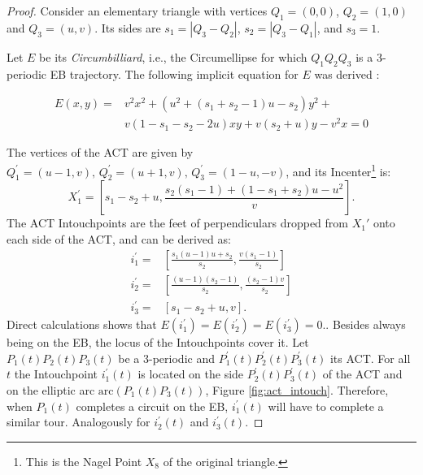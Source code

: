 \begin{proof}
Consider an elementary triangle with vertices $Q_1=(0,0)$, $Q_2=(1,0)$  and $Q_3=(u,v)$. Its sides are $s_1=|Q_3-Q_2|$, $s_2=|Q_3-Q_1|$, and $s_3=1$.

Let $E$ be its {\em Circumbilliard}, i.e., the Circumellipse for which ${Q_1}{Q_2}{Q_3}$ is a 3-periodic EB trajectory. The following implicit equation for $E$ was derived \cite{garcia2019-incenter}:

\begin{align*}
 E(x,y)=& v^2 x^2+(u^2+(s_1+s_2-1)u-s_2 )y^2+\\
 &v( 1-s_1-s_2-2u )x y+v(s_2+u)y-v^2x =0
\end{align*}

The vertices of the ACT are given by
 $Q_1^\prime=(u-1,v),\,Q_2^\prime=(u+1,v),\,Q_3^\prime=(1-u,-v)$, and its Incenter\footnote{This is the Nagel Point $X_8$ of the original triangle.} is:
 \begin{equation*}
 X_1^\prime=\left[s_1-s_2+u, \frac{s_2(s_1-1)+(1-s_1+s_2)u  -u^2}{v}
 \right].
 \end{equation*}
 The ACT Intouchpoints are the feet of perpendiculars dropped from $X_1'$ onto each side of the ACT, and can be derived as:
 \begin{align*}
 i_1^\prime=& \left[ \frac{s_1(u-1)u+s_2}{s_2},\frac{ v (s_1-1)}{s_2} \right]\\
  i_2^\prime=& \left[  \frac{ (u-1)(s_2-1)}{s_2}, \frac{(s_2-1)v}{s_2}   \right]\\
   i_3^\prime=& \left[   s_1-s_2+u,v \right].
\end{align*}
Direct calculations shows that
$E(i_1^\prime)=E(i_2^\prime)=E(i_3^\prime)=0.$. Besides always being on the EB, the locus of the Intouchpoints cover it. Let $P_1(t)P_2(t)P_3(t)$ be a 3-periodic and $P_1^{\prime} (t)P_2^{\prime}(t)P_3^{\prime}(t)$ its ACT.
 For all $t$ the Intouchpoint $i_1^{\prime}(t)$ is located on the side $P_2^{\prime}(t) P_3^{\prime}(t)$ of the ACT and on the elliptic arc     $\textrm{arc}(P_1(t)P_3(t))$, Figure \ref{fig:act_intouch}. Therefore, when $P_1(t)$ completes a circuit on the EB, $i_1^{\prime}(t)$ will have to complete a similar tour. 
Analogously for  $i_2^{\prime}(t)$ and  $i_3^{\prime}(t)$.
\end{proof}


